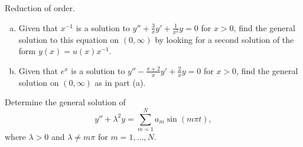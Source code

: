 \documentclass[12pt,letterpaper]{hmcpset}
\begin{document}
\begin{solution}
    \vfill
\end{solution}
\clearpage

\begin{problem}[E4]
    Reduction of order.
    \begin{enumerate}[(a)]
        \item Given that $x^{-1}$ is a solution to
            $y'' + \frac{3}{x}y'+\frac{1}{x^2}y=0$ for
            $x>0$, find the general solution to this
            equation on $(0,\infty)$ by looking for a second
            solution of the form $y(x)=u(x)x^{-1}$.
        \item Given that $e^x$ is a solution to
            $y'' - \frac{x+2}{x}y' + \frac{2}{x}y=0$ for
            $x>0$, find the general solution on $(0,\infty)$
            as in part (a).
    \end{enumerate}
\end{problem}

\begin{solution}
    \vfill
\end{solution}
\clearpage

\begin{problem}[E5]
    Determine the general solution of
    \[
        y'' + \lambda^2y = \sum_{m=1}^N a_m\sin(m\pi t),
    \]
    where $\lambda > 0$ and $\lambda \neq m\pi$ for
    $m=1,\dots,N$.
\end{problem}

\begin{solution}
    \vfill
\end{solution}
\clearpage
\end{document}
